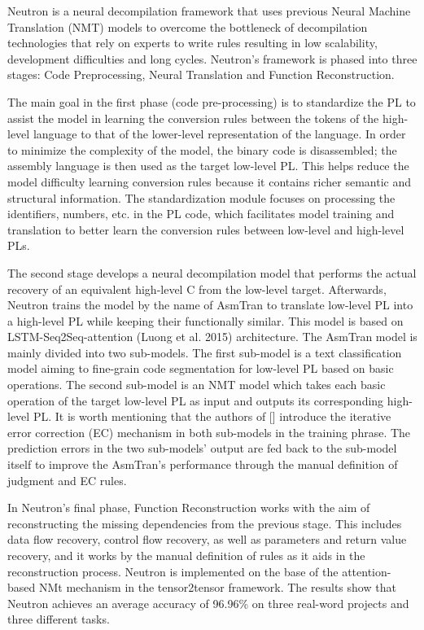 \documentclass{article}
\begin{document}
Neutron is a neural decompilation framework that uses previous Neural Machine Translation (NMT) models to overcome the bottleneck of decompilation technologies that rely on experts to write rules resulting in low scalability, development difficulties and long cycles. Neutron’s framework is phased into three stages: Code Preprocessing, Neural Translation and Function Reconstruction.

The main goal in the first phase (code pre-processing) is to standardize the PL to assist the model in learning the conversion rules between the tokens of the high-level language to that of the lower-level representation of the language. In order to minimize the complexity of the model, the binary code is disassembled; the assembly language is then used as the target low-level PL. This helps reduce the model difficulty learning conversion rules because it contains richer semantic and structural information. The standardization module focuses on processing the identifiers, numbers, etc. in the PL code, which facilitates model training and translation to better learn the conversion rules between low-level and high-level PLs.

The second stage develops a neural decompilation model that performs the actual recovery of an equivalent high-level C from the low-level target. Afterwards, Neutron trains the model by the name of AsmTran to translate low-level PL into a high-level PL while keeping their functionally similar. This model is based on LSTM-Seq2Seq-attention (Luong et al. 2015) architecture. The AsmTran model is mainly divided into two sub-models. The first sub-model is a text classification model aiming to fine-grain code segmentation for low-level PL based on basic operations. The second sub-model is an NMT model which takes each basic operation of the target low-level PL as input and outputs its corresponding high-level PL. It is worth mentioning that the authors of [] introduce the iterative error correction (EC) mechanism in both sub-models in the training phrase. The prediction errors in the two sub-models’ output are fed back to the sub-model itself to improve the AsmTran’s performance through the manual definition of judgment and EC rules.

In Neutron’s final phase, Function Reconstruction works with the aim of reconstructing the missing dependencies from the previous stage. This includes data flow recovery, control flow recovery, as well as parameters and return value recovery, and it works by the manual definition of rules as it aids in the reconstruction process. Neutron is implemented on the base of the attention-based NMt mechanism in the tensor2tensor framework. The results show that Neutron achieves an average accuracy of 96.96\% on three real-word projects and three different tasks.
\end{document}
